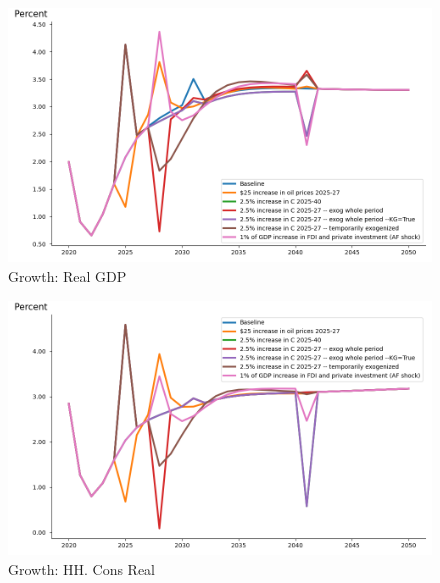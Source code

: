 \documentclass{article}
\begin{document}
 
\begin{figure}[htbp]
\centering
\includegraphics[width=\textwidth]{"../My_first_plot/Real GDP, growth.png"}
\caption{Growth: Real GDP}
\end{figure} 
 
\begin{figure}[htbp]
\centering
\includegraphics[width=\textwidth]{"../My_first_plot/HH. Cons Real, growth.png"}
\caption{Growth: HH. Cons Real}
\end{figure} 
\end{document}
